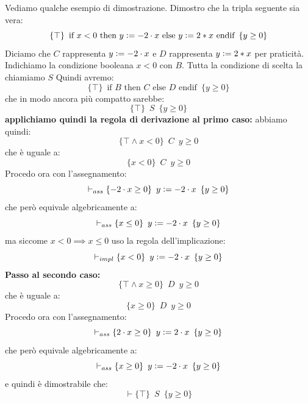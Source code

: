 \begin{esempio}
	Vediamo qualche esempio di dimostrazione. Dimostro che la tripla seguente sia
	vera:
	\[\{\top\}\,\,\,\mbox{if } x<0 \mbox{ then }y\cceq -2\cdot x \mbox{ else }
		y\cceq 2*x\mbox{ endif}\,\,\,\{y\geq 0\}\]
		Diciamo che $C$ rappresenta $y\cceq -2\cdot x$ e $D$ rappresenta $y\cceq 2*x$
		per praticità. Indichiamo la condizione booleana $x<0$ con $B$. Tutta la
		condizione di scelta la chiamiamo $S$
		Quindi avremo:
		\[\{\top\}\,\,\,\mbox{if } B \mbox{ then }C\mbox{ else }
			D \mbox{ endif}\,\,\,\{y\geq 0\}\]
			che in modo ancora più compatto sarebbe:
			\[\{\top\}\,\,\, S\,\,\,\{y\geq 0\}\]
			\textbf{applichiamo quindi la regola di derivazione al primo caso:}
			abbiamo quindi:
			\[\{\top \land x<0\}\,\,\, C\,\,\,{y\geq 0}\]
			che è uguale a:
			\[\{x<0\}\,\,\, C\,\,\,{y\geq 0}\]
			Procedo ora con l'assegnamento:
			\[\vdash_{ass}\{-2\cdot x\geq 0\}\,\,\, y\cceq -2\cdot x\,\,\,\{y\geq 0\}\]
			che però equivale algebricamente a:
			\[\vdash_{ass}\{x\leq 0\}\,\,\, y\cceq -2\cdot x\,\,\,\{y\geq 0\}\]
			ma siccome $x<0 \implies x\leq 0$ uso la regola dell'implicazione:
			\[\vdash_{impl}\{x< 0\}\,\,\, y\cceq -2\cdot x\,\,\,\{y\geq 0\}\]
			\textbf{Passo al secondo caso:}
			\[\{\top \land x\geq 0\}\,\,\, D\,\,\,{y\geq 0}\]
			che è uguale a:
			\[\{x\geq 0\}\,\,\, D\,\,\,{y\geq 0}\]
			Procedo ora con l'assegnamento:
			\[\vdash_{ass}\{2\cdot x\geq 0\}\,\,\, y\cceq 2\cdot x\,\,\,\{y\geq 0\}\]
			che però equivale algebricamente a:
			\[\vdash_{ass}\{x\geq 0\}\,\,\, y\cceq -2\cdot x\,\,\,\{y\geq 0\}\]
			e quindi è dimostrabile che:
			\[\vdash \{\top\}\,\,\, S\,\,\,\{y\geq 0\}\]
			\end{esempio}

